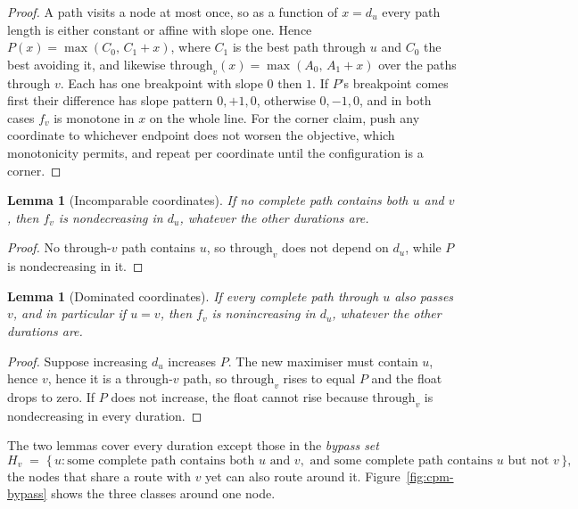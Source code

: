\documentclass[12pt]{report}
\newtheorem{lemma}[theorem]{Lemma}
\begin{document}
\begin{proof}
A path visits a node at most once, so as a function of $x = d_u$ every path
length is either constant or affine with slope one. Hence
$P(x) = \max(C_0,\, C_1 + x)$, where $C_1$ is the best path through $u$ and
$C_0$ the best avoiding it, and likewise
$\mathrm{through}_v(x) = \max(A_0,\, A_1 + x)$ over the paths through $v$.
Each has one breakpoint with slope $0$ then $1$. If $P$'s breakpoint comes
first their difference has slope pattern $0, +1, 0$, otherwise $0, -1, 0$,
and in both cases $f_v$ is monotone in $x$ on the whole line. For the
corner claim, push any coordinate to whichever endpoint does not worsen the
objective, which monotonicity permits, and repeat per coordinate until the
configuration is a corner.
\end{proof}

\begin{lemma}[Incomparable coordinates]
\label{lem:cpm-incomparable}
If no complete path contains both $u$ and $v$, then $f_v$ is nondecreasing
in $d_u$, whatever the other durations are.
\end{lemma}

\begin{proof}
No through-$v$ path contains $u$, so $\mathrm{through}_v$ does not depend on
$d_u$, while $P$ is nondecreasing in it.
\end{proof}

\begin{lemma}[Dominated coordinates]
\label{lem:cpm-dominated}
If every complete path through $u$ also passes $v$, and in particular if
$u = v$, then $f_v$ is nonincreasing in $d_u$, whatever the other durations
are.
\end{lemma}

\begin{proof}
Suppose increasing $d_u$ increases $P$. The new maximiser must contain $u$,
hence $v$, hence it is a through-$v$ path, so $\mathrm{through}_v$ rises to
equal $P$ and the float drops to zero. If $P$ does not increase, the float
cannot rise because $\mathrm{through}_v$ is nondecreasing in every duration.
\end{proof}

The two lemmas cover every duration except those in the \emph{bypass set}
\[
H_v \;=\; \{\, u : \text{some complete path contains both } u \text{ and } v,
\text{ and some complete path contains } u \text{ but not } v \,\},
\]
the nodes that share a route with $v$ yet can also route around it.
Figure~\ref{fig:cpm-bypass} shows the three classes around one node.
\end{document}
